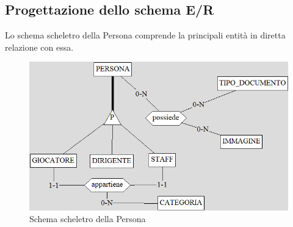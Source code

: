 \documentclass[a4paper,12pt]{report}
\begin{document}
\subsection{Progettazione dello schema E/R}
Lo schema scheletro della Persona comprende la principali entità in diretta relazione con essa.
\begin{figure}[htp]
    \centering
    \includegraphics[width = \textwidth]{GSS_report/img/persona.png}
    \caption{Schema scheletro della Persona}
\end{figure}
\end{document}
